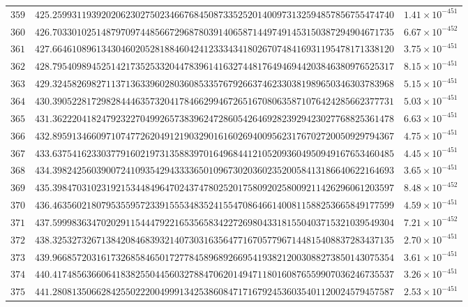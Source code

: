 \documentclass[12pt,reqno]{amsart}
\theoremstyle{remark}
\begin{document}
\begin{longtable}{clc}
$359$ & $425.2599311939202062302750234667684508733525201400973132594857856755474740$ & $1.41\times 10^{-451}$ \\
$360$ & $426.7033010251487970974485667296878039140658714497491453150387294904671735$ & $6.67\times 10^{-452}$ \\
$361$ & $427.6646108961343046020528188460424123334341802670748416931195478171338120$ & $3.75\times 10^{-451}$ \\
$362$ & $428.7954098945251421735253320447839614163274481764946944203846380976525317$ & $8.15\times 10^{-451}$ \\
$363$ & $429.3245826982711371363396028036085335767926637462330381989650346303783968$ & $5.15\times 10^{-451}$ \\
$364$ & $430.3905228172982844463573204178466299467265167080635871076424285662377731$ & $5.03\times 10^{-451}$ \\
$365$ & $431.3622204182479232270499265738396247286054264692823929423027768825361478$ & $6.63\times 10^{-451}$ \\
$366$ & $432.8959134660971074772620491219032901616026940095623176702720050929794367$ & $4.75\times 10^{-451}$ \\
$367$ & $433.6375416233037791602197313588397016496844121052093604950949167653460485$ & $4.45\times 10^{-451}$ \\
$368$ & $434.3982425603900724109354294333365010967302036023520058413186640622164693$ & $3.65\times 10^{-451}$ \\
$369$ & $435.3984703102319215344849647024374780252017580920258009211426296061203597$ & $8.48\times 10^{-452}$ \\
$370$ & $436.4635602180795355957233915553483524155470864661400811588253665849177599$ & $4.59\times 10^{-451}$ \\
$371$ & $437.5999836347020291154447922165356583422726980433181550403715321039549304$ & $7.21\times 10^{-452}$ \\
$372$ & $438.3253273267138420846839321407303163564771670577967144815408837283437135$ & $2.70\times 10^{-451}$ \\
$373$ & $439.9668572031617326858465017277845896892669541938212003088273850143075354$ & $3.61\times 10^{-451}$ \\
$374$ & $440.4174856366064183825504456032788470620149471180160876559907036246735537$ & $3.26\times 10^{-451}$ \\
$375$ & $441.2808135066284255022200499913425386084717167924536035401120024579457587$ & $2.53\times 10^{-451}$ \\

\end{longtable}
\end{document}

